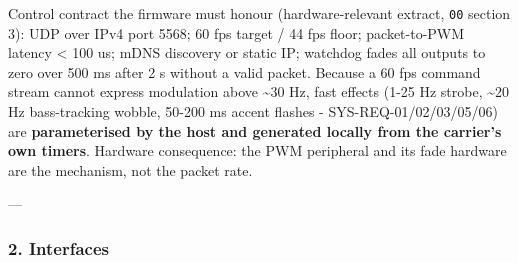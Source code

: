 \documentclass[11pt,a4paper]{article}
\begin{document}
Control contract the firmware must honour (hardware-relevant extract, \texttt{00} section 3): UDP over IPv4 port 5568; 60 fps target / 44 fps floor; packet-to-PWM latency \textless{} 100 us; mDNS discovery or static IP; watchdog fades all outputs to zero over 500 ms after 2 s without a valid packet. Because a 60 fps command stream cannot express modulation above \textasciitilde{}30 Hz, fast effects (1-25 Hz strobe, \textasciitilde{}20 Hz bass-tracking wobble, 50-200 ms accent flashes - SYS-REQ-01/02/03/05/06) are \textbf{parameterised by the host and generated locally from the carrier's own timers}. Hardware consequence: the PWM peripheral and its fade hardware are the mechanism, not the packet rate.

---

\subsubsection*{2. Interfaces}
\end{document}
